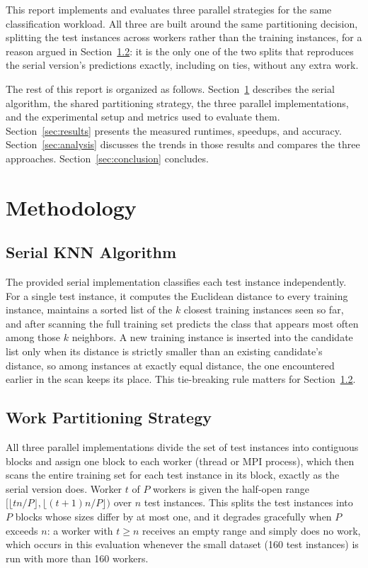\documentclass[conference]{IEEEtran}
\begin{document}
This report implements and evaluates three parallel strategies for the
same classification workload. All three are built around the same
partitioning decision, splitting the test instances across workers rather
than the training instances, for a reason argued in Section~\ref{sec:partition}:
it is the only one of the two splits that reproduces the serial version's
predictions exactly, including on ties, without any extra work.

The rest of this report is organized as follows. Section~\ref{sec:methodology}
describes the serial algorithm, the shared partitioning strategy, the three
parallel implementations, and the experimental setup and metrics used to
evaluate them. Section~\ref{sec:results} presents the measured runtimes,
speedups, and accuracy. Section~\ref{sec:analysis} discusses the trends in
those results and compares the three approaches. Section~\ref{sec:conclusion}
concludes.

\section{Methodology}
\label{sec:methodology}

\subsection{Serial KNN Algorithm}

The provided serial implementation classifies each test instance
independently. For a single test instance, it computes the Euclidean
distance to every training instance, maintains a sorted list of the $k$
closest training instances seen so far, and after scanning the full
training set predicts the class that appears most often among those $k$
neighbors. A new training instance is inserted into the candidate list only
when its distance is strictly smaller than an existing candidate's
distance, so among instances at exactly equal distance, the one encountered
earlier in the scan keeps its place. This tie-breaking rule matters for
Section~\ref{sec:partition}.

\subsection{Work Partitioning Strategy}
\label{sec:partition}

All three parallel implementations divide the set of test instances into
contiguous blocks and assign one block to each worker (thread or MPI
process), which then scans the entire training set for each test instance
in its block, exactly as the serial version does. Worker $t$ of $P$ workers
is given the half-open range $[\lfloor tn/P \rfloor, \lfloor (t+1)n/P
\rfloor)$ over $n$ test instances. This splits the test instances into $P$
blocks whose sizes differ by at most one, and it degrades gracefully when
$P$ exceeds $n$: a worker with $t \geq n$ receives an empty range and
simply does no work, which occurs in this evaluation whenever the small
dataset (160 test instances) is run with more than 160 workers.
\end{document}
